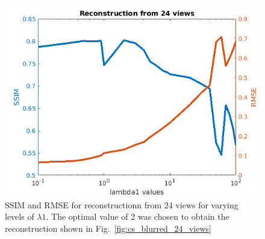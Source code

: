 \documentclass{article}
\begin{document}
\begin{figure}[!h]
\centering
       \includegraphics[width=\columnwidth]{../images/potato/2D/cs_blurred_results/SSIM_RMSE_24_angles.png}
\caption{SSIM and RMSE for reconstructionn from 24 views for varying levels of $\lambda1$. The optimal value of 2 was chosen to obtain the reconstruction shown in Fig.~\ref{fig:cs_blurred_24_views}}
\label{fig:ssim_rmse_24_views}
\end{figure}
\newpage
\end{document}
